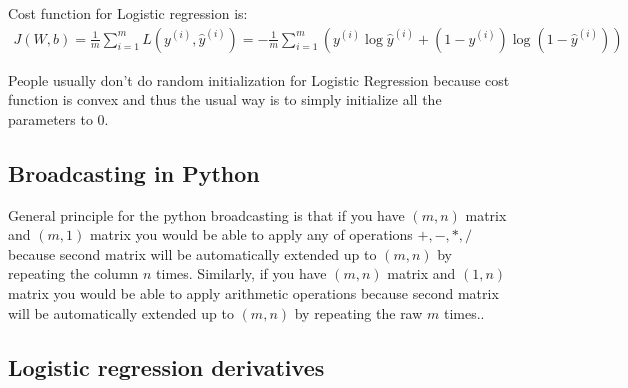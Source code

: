 \documentclass[a4paper]{report}
\begin{document}
Cost function for Logistic regression is:
\begin{align}
J(W, b) = \frac{1}{m}\sum_{i = 1}^{m}L(y^{(i)}, \hat{y}^{(i)}) = -\frac{1}{m}\sum_{i = 1}^{m}(y^{(i)}\log{\hat{y}^{(i)}} + (1 - y^{(i)})\log{(1 - \hat{y}^{(i)})})
\end{align}

People usually don't do random initialization for Logistic Regression because cost function is convex and thus the usual way is to simply initialize all the parameters to $0$.

\subsection{Broadcasting in Python}

General principle for the python broadcasting is that if you have $(m, n)$ matrix and $(m, 1)$ matrix you would be able to apply any of operations $+, -, *, /$ because second matrix will be automatically extended up to $(m, n)$ by repeating the column $n$ times. Similarly, if you have $(m, n)$ matrix and $(1, n)$ matrix you would be able to apply arithmetic operations because second matrix will be automatically extended up to $(m, n)$ by repeating the raw $m$ times..
  
\subsection{Logistic regression derivatives}
\end{document}
